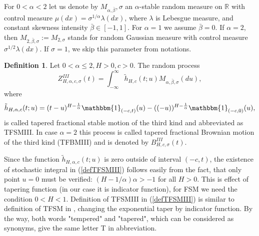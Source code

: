 \documentclass[12pt]{article}
\def\bbr{{\mathbb R}}
\def\a{\alpha}
\def\b{\beta}
\def\l{\lambda}
\def\s{\sigma}
\newcommand{\ind}[1]{\mathbbm{1}_{#1}}
\theoremstyle{plain}
\theoremstyle{definition}
\newtheorem{definition}[teo]{Definition}
\begin{document}
 For $0<\a<2$ let us denote by $M_{\a,{\bar \b}},\s$ an $\a$-stable random measure on $\bbr$ with   control measure $\mu(dx)=\s^{1/\a}\l(dx)$, where $\l$ is Lebesgue measure,   and constant skewness intensity ${\bar \b}\in [-1, 1]$. For $\a=1$ we assume ${\bar \b}=0$. If $\a=2$, then  $M_{2,{\bar \b}, \s}:=M_{2, \s}$ stands for random Gaussian measure with   control measure $\s^{1/2}\l(dx)$. If $\s=1$, we skip this parameter from notations.
 \begin{definition}\label{TFSMIII} Let $0<\a\le 2, H>0, c>0$. The random process
 \begin{equation}\label{defTFSMIII}
Z_{H, \a, c, \s}^{III}(t)=\int_{-\infty}^{\infty} {\tilde h}_{H, c} (t; u) M_{\a, {\bar \b}, \s}(du),
\end{equation}
where
\begin{equation}\label{deftildeh}
{\tilde h}_{H, \a, c} (t; u)=(t-u)^{H-\frac{1}{\a}}\ind{(-c, t)}(u)- ((-u))^{H-\frac{1}{\a}}\ind{(-c, 0)}(u),
\end{equation}
is called tapered fractional stable motion of the third kind and abbreviated as TFSMIII. In case $\a=2$ this process is called tapered fractional Brownian motion of the third kind (TFBMIII) and is denoted by $B_{H, c, \s}^{III}(t)$.
\end{definition}
Since the function ${\tilde h}_{H, \a, c} (t; u)$ is zero outside of interval $(-c, t)$, the existence of stochastic integral in (\ref{defTFSMIII}) follows easily  from the fact, that only point $u=0$ must be verified: $(H-1/\a)\a >-1$ for all $H>0$. This is effect of tapering function (in our case it is indicator function), for FSM we need the condition $0<H<1$. Definition of TFSMIII in (\ref{defTFSMIII}) is similar to definition of TFSM in \cite{Sabzikar3}, changing the exponential taper by indicator function. By the way, both words "tempered" and "tapered", which can be considered as synonyms, give the same letter T in abbreviation.
\end{document}
